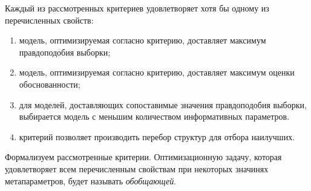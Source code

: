 Каждый из рассмотренных критериев удовлетворяет хотя бы одному из перечисленных свойств:
\begin{enumerate}[label={\arabic*)}]
\item модель, оптимизируемая согласно критерию, доставляет максимум правдоподобия выборки;
\item модель, оптимизируемая согласно критерию, доставляет максимум оценки обоснованности;
\item для моделей, доставляющих сопоставимые значения правдоподобия выборки, выбирается модель с меньшим количеством информативных параметров.
\item критерий позволяет производить перебор структур для отбора наилучших.
\end{enumerate}

Формализуем рассмотренные критерии. Оптимизационную задачу, которая удовлетворяет всем перечисленным свойствам при некоторых значинях метапараметров, будет называть \textit{обобщающей}.


